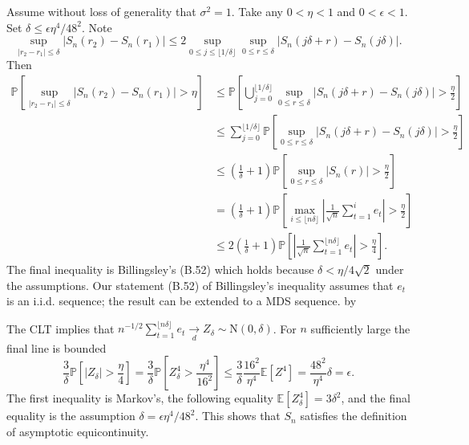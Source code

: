 \documentclass[10pt]{article}
\begin{document}
Assume without loss of generality that $\sigma^{2}=1$. Take any $0<\eta<1$ and $0<\epsilon<1$. Set $\delta \leq \epsilon \eta^{4} / 48^{2}$. Note
$$
\sup _{\left|r_{2}-r_{1}\right| \leq \delta}\left|S_{n}\left(r_{2}\right)-S_{n}\left(r_{1}\right)\right| \leq 2 \sup _{0 \leq j \leq\lfloor 1 / \delta\rfloor} \sup _{0 \leq r \leq \delta}\left|S_{n}(j \delta+r)-S_{n}(j \delta)\right| .
$$
Then
$$
\begin{aligned}
\mathbb{P}\left[\sup _{\left|r_{2}-r_{1}\right| \leq \delta}\left|S_{n}\left(r_{2}\right)-S_{n}\left(r_{1}\right)\right|>\eta\right] & \leq \mathbb{P}\left[\bigcup_{j=0}^{\lfloor 1 / \delta\rfloor} \sup _{0 \leq r \leq \delta}\left|S_{n}(j \delta+r)-S_{n}(j \delta)\right|>\frac{\eta}{2}\right] \\
& \leq \sum_{j=0}^{\lfloor 1 / \delta\rfloor} \mathbb{P}\left[\sup _{0 \leq r \leq \delta}\left|S_{n}(j \delta+r)-S_{n}(j \delta)\right|>\frac{\eta}{2}\right] \\
& \leq\left(\frac{1}{\delta}+1\right) \mathbb{P}\left[\sup _{0 \leq r \leq \delta}\left|S_{n}(r)\right|>\frac{\eta}{2}\right] \\
&=\left(\frac{1}{\delta}+1\right) \mathbb{P}\left[\max _{i \leq\lfloor n \delta\rfloor}\left|\frac{1}{\sqrt{n}} \sum_{t=1}^{i} e_{t}\right|>\frac{\eta}{2}\right] \\
& \leq 2\left(\frac{1}{\delta}+1\right) \mathbb{P}\left[\left|\frac{1}{\sqrt{n}} \sum_{t=1}^{\lfloor n \delta\rfloor} e_{t}\right|>\frac{\eta}{4}\right] .
\end{aligned}
$$
The final inequality is Billingsley's (B.52) which holds because $\delta<\eta / 4 \sqrt{2}$ under the assumptions. Our statement (B.52) of Billingsley's inequality assumes that $e_{t}$ is an i.i.d. sequence; the result can be extended to a MDS sequence. by

The CLT implies that $n^{-1 / 2} \sum_{t=1}^{\lfloor n \delta\rfloor} e_{t} \underset{d}{\rightarrow} Z_{\delta} \sim \mathrm{N}(0, \delta)$. For $n$ sufficiently large the final line is bounded
$$
\frac{3}{\delta} \mathbb{P}\left[\left|Z_{\delta}\right|>\frac{\eta}{4}\right]=\frac{3}{\delta} \mathbb{P}\left[Z_{\delta}^{4}>\frac{\eta^{4}}{16^{2}}\right] \leq \frac{3}{\delta} \frac{16^{2}}{\eta^{4}} \mathbb{E}\left[Z^{4}\right]=\frac{48^{2}}{\eta^{4}} \delta=\epsilon .
$$
The first inequality is Markov's, the following equality $\mathbb{E}\left[Z_{\delta}^{4}\right]=3 \delta^{2}$, and the final equality is the assumption $\delta=\epsilon \eta^{4} / 48^{2}$. This shows that $S_{n}$ satisfies the definition of asymptotic equicontinuity.
\end{document}
